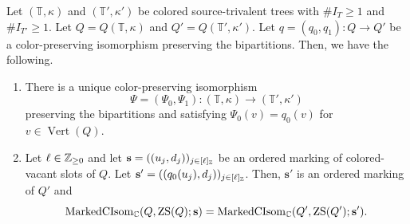 \begin{lemma}\label{lem:retained-tree-recovery}
Let $(\mathbb T,\kappa)$ and $(\mathbb T',\kappa')$ be colored source-trivalent trees with $\#I_T\ge1$ and $\#I_{T'}\ge1$.
Let $Q=Q(\mathbb T,\kappa)$ and $Q'=Q(\mathbb T',\kappa')$.
Let $q=(q_0,q_1):Q\to Q'$ be a color-preserving isomorphism preserving the bipartitions.
Then, we have the following.
\begin{enumerate}
\item\label{c:retained-tree-extension} There is a unique color-preserving isomorphism
\[
 \Psi=(\Psi_0,\Psi_1):(\mathbb T,\kappa)\longrightarrow(\mathbb T',\kappa')
\]
preserving the bipartitions and satisfying
$\Psi_0(v)=q_0(v)$ for $v\in\operatorname{Vert}(Q)$.
\item\label{c:retained-marked-transport} Let $\ell\in\mathbb Z_{\ge0}$ and let
$\mathbf s=((u_j,d_j))_{j\in[\ell]_{\mathbb Z}}$ be an ordered marking of colored-vacant slots of $Q$.
Let $\mathbf s'=((q_0(u_j),d_j))_{j\in[\ell]_{\mathbb Z}}$.
Then, $\mathbf s'$ is an ordered marking of $Q'$ and
\[
 \operatorname{MarkedCIsom}_{\mathbb C}(Q,\operatorname{ZS}(Q);\mathbf s)
 =\operatorname{MarkedCIsom}_{\mathbb C}(Q',\operatorname{ZS}(Q');\mathbf s').
\]
\end{enumerate}
\end{lemma}

